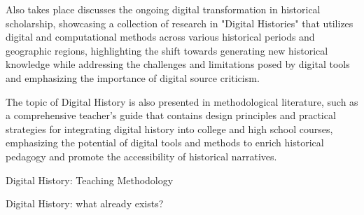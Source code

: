 Also takes place discusses the ongoing digital transformation in historical scholarship, showcasing a collection of research in "Digital Histories" that utilizes digital and computational methods across various historical periods and geographic regions, highlighting the shift towards generating new historical knowledge while addressing the challenges and limitations posed by digital tools and emphasizing the importance of digital source criticism. \cite{fridlund}

The topic of Digital History is also presented in methodological literature, such as a comprehensive teacher's guide that contains design principles and practical strategies for integrating digital history into college and high school courses, emphasizing the potential of digital tools and methods to enrich historical pedagogy and promote the accessibility of historical narratives\cite{guiliano}.




Digital History: Teaching Methodology 

Digital History: what already exists?






